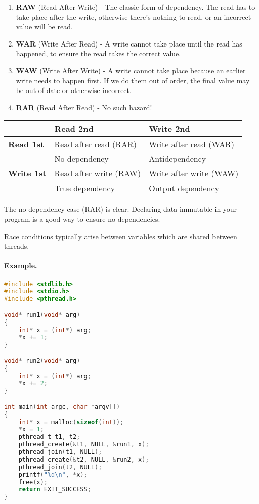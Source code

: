 \begin{enumerate}
	\item \textbf{RAW} (Read After Write) - The classic form of dependency. The read has to take place after the write, otherwise there's nothing to read, or an incorrect value will be read.
	\item \textbf{WAR} (Write After Read) - A write cannot take place until the read has happened, to ensure the read takes the correct value.
	\item \textbf{WAW} (Write After Write) - A write cannot take place because an earlier write needs to happen first. If we do them out of order, the final value may be out of date or otherwise incorrect.
	\item \textbf{RAR} (Read After Read) - No such hazard! 
\end{enumerate}

\begin{center}
\begin{tabular}{l|ll}
& {\bf Read 2nd} & {\bf Write 2nd} \\ \hline
{\bf Read 1st} & Read after read (RAR) & Write after read (WAR) \\
& No dependency & Antidependency \\
{\bf Write 1st} & Read after write (RAW) & Write after write (WAW) \\
& True dependency & Output dependency
\end{tabular}
\end{center}

The no-dependency case (RAR) is clear. Declaring data immutable 
in your program is a good way to ensure no dependencies.


Race conditions typically arise between variables which are shared
between threads.

\paragraph{Example.}
\begin{lstlisting}[language=C]
#include <stdlib.h>
#include <stdio.h>
#include <pthread.h>

void* run1(void* arg)
{
    int* x = (int*) arg;
    *x += 1;
}

void* run2(void* arg)
{
    int* x = (int*) arg;
    *x += 2;
}

int main(int argc, char *argv[])
{
    int* x = malloc(sizeof(int));
    *x = 1;
    pthread_t t1, t2;
    pthread_create(&t1, NULL, &run1, x);
    pthread_join(t1, NULL);
    pthread_create(&t2, NULL, &run2, x);
    pthread_join(t2, NULL);
    printf("%d\n", *x);
    free(x);
    return EXIT_SUCCESS;
}
\end{lstlisting}

